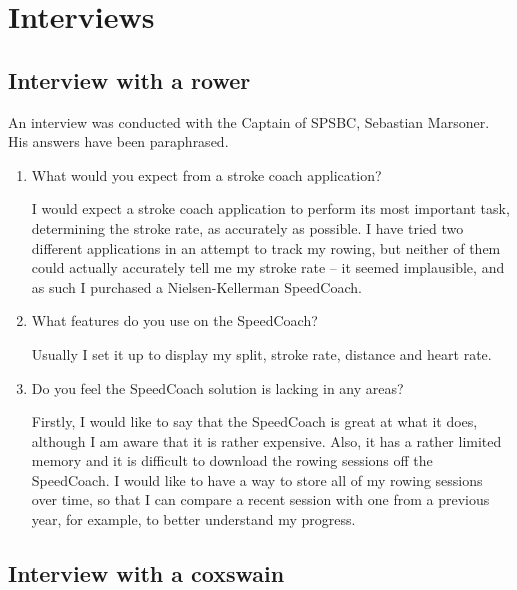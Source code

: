 \documentclass[11pt,twoside,a4paper]{report}
\begin{document}
\section{Interviews}

\subsection{Interview with a rower}

An interview was conducted with the Captain of SPSBC, Sebastian Marsoner. \\ His answers have been paraphrased.
\begin{enumerate}
  \item What would you expect from a stroke coach application?
  
I would expect a stroke coach application to perform its most important task, determining the stroke rate, as accurately as possible. I have tried two different applications in an attempt to track my rowing, but neither of them could actually accurately tell me my stroke rate -- it seemed implausible, and as such I purchased a Nielsen-Kellerman SpeedCoach.

\item What features do you use on the SpeedCoach?

Usually I set it up to display my split, stroke rate, distance and heart rate. 

\item Do you feel the SpeedCoach solution is lacking in any areas?

Firstly, I would like to say that the SpeedCoach is great at what it does, although I am aware that it is rather expensive. Also, it has a rather limited memory and it is difficult to download the rowing sessions off the SpeedCoach. I would like to have a way to store all of my rowing sessions over time, so that I can compare a recent session with one from a previous year, for example, to better understand my progress.

\end{enumerate}

\subsection{Interview with a coxswain}
\end{document}
